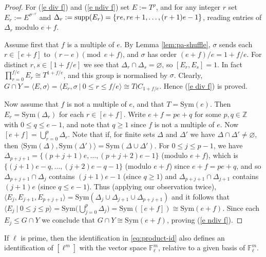 \documentclass[12pt]{amsart}
\theoremstyle{remark}
\theoremstyle{definition}
\newcommand{\sym}{\mathrm{Sym}}
\begin{document}
\begin{proof}
For (\ref{e div f}) and (\ref{e ndiv f}) set $E := T^\rho$, and for any integer $r$ set $E_r := E^{\sigma^{-r}}$ and $\Delta_r := \textnormal{supp}(E_r) = \{ re, re+1, \dots, (r+1)e-1 \}$, reading entries of $\Delta_r$ modulo $e+f$.

Assume first that $f$ is a multiple of $e$. By Lemma \ref{lem:pa-shuffle}, $\sigma$ sends each  $r \in [e+f]$ to $(r-e)\pmod{e+f}$, and $\sigma$ has order $(e+f)/e = 1 + f/e$. For distinct $r, s \in [1+f/e]$ we see that $\Delta_r \cap \Delta_s = \varnothing$, so $[E_r,E_s] = 1$. In fact $\prod_{r=0}^{f/e} E_r \cong T^{1+f/e}$, and this group is normalised by $\sigma$. Clearly, $G \cap Y = \langle E, \sigma \rangle = \langle E_r, \sigma \ | \ 0 \leqslant r \leqslant f/e \rangle \cong T \wr C_{1+f/e}$. Hence (\ref{e div f}) is proved.

Now assume that $f$ is not a multiple of $e$, and that $T = \sym(e)$. Then $E_r = \sym(\Delta_r)$ for each $r \in [e+f]$. Write $e+f = pe + q$ for some $p, q \in \mathbb{Z}$ with $0 \leqslant q \leqslant e-1$, and note that $q \geqslant 1$ since $f$ is not a multiple of $e$. Now $[e+f] = \bigcup_{r=0}^p \Delta_r$. Note that if, for finite sets $\Delta$ and $\Delta'$ we have $\Delta \cap \Delta' \neq \varnothing$, then $\langle \sym(\Delta), \sym(\Delta') \rangle = \sym(\Delta \cup \Delta')$. For $0 \leqslant j \leqslant p-1$, we have $\Delta_{p+j+1} = \{ (p+j+1)e, \ldots, (p+j+2)e-1 \}$  (modulo $e+f$),  which is 
$\{ (j+1)e-q, \ldots, (j+2)e-q-1 \}$ (modulo $e+f$) since  $e+f = pe+q$, and so $\Delta_{p+j+1} \cap \Delta_j$ contains $(j+1)e-1$ (since $q \geqslant 1$) and $\Delta_{p+j+1} \cap \Delta_{j+1}$ contains $(j+1)e$ (since $q \leqslant e-1$). Thus (applying our observation twice), $\langle E_j, E_{j+1}, E_{p+j+1} \rangle = \sym(\Delta_j \cup \Delta_{j+1} \cup \Delta_{p+j+1})$ and it follows that $\langle E_j \ | \ 0 \leqslant j \leqslant p \rangle = \sym\big(\bigcup_{j=0}^p \Delta_j\big) = \sym([e+f]) \cong \sym(e+f)$. Since each $E_j \leqslant G \cap Y$ we conclude that $G \cap Y \cong \sym(e+f)$, proving (\ref{e ndiv f}).
\end{proof}


If $\ell$ is prime, then the identification in \eqref{eq:product-id} also defines an identification of $[\ell^m]$ with the vector space $\mathbb F_\ell^m$, relative to a given basis of $\mathbb F_\ell^m$.

\end{document}
